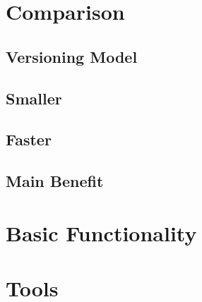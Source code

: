 \begin{frame}
 \titlepage
\end{frame}

\section{Comparison}
	
	\subsection{Versioning Model}
	
	\subsection{Smaller}
	
	\subsection{Faster}
	
	\subsection{Main Benefit}
	
\section{Basic Functionality}












\section{Tools}

